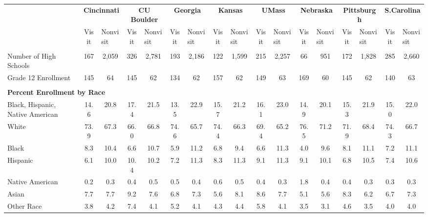 \begin{tabular*}{\linewidth}{@{\extracolsep{\fill} } lcccccccccccccccc}%
&\multicolumn{2}{c}{\bfseries Cincinnati}&\multicolumn{2}{c}{\bfseries CU Boulder}&\multicolumn{2}{c}{\bfseries Georgia}&\multicolumn{2}{c}{\bfseries Kansas}&\multicolumn{2}{c}{\bfseries UMass}&\multicolumn{2}{c}{\bfseries Nebraska}&\multicolumn{2}{c}{\bfseries Pittsburgh}&\multicolumn{2}{c}{\bfseries S.Carolina}\\%
&Visit&\multicolumn{1}{l}{Nonvisit}&Visit&\multicolumn{1}{l}{Nonvisit}&Visit&\multicolumn{1}{l}{Nonvisit}&Visit&\multicolumn{1}{l}{Nonvisit}&Visit&\multicolumn{1}{l}{Nonvisit}&Visit&\multicolumn{1}{l}{Nonvisit}&Visit&\multicolumn{1}{l}{Nonvisit}&Visit&\multicolumn{1}{l}{Nonvisit}\\%
\hline%
&&&&&&&&&&&&&&&&\\%
\hspace{0cm}Number of High Schools&167&2,059&326&2,781&193&2,186&122&1,599&215&2,257&66&951&172&1,828&285&2,660\\%
\hspace{0cm}Grade 12 Enrollment&145&64&145&62&134&62&157&62&149&63&169&60&145&62&140&63\\%
&&&&&&&&&&&&&&&&\\%
\multicolumn{17}{l}{\bfseries Percent Enrollment by Race}\\%
\hspace{0.2cm}Black, Hispanic, Native American&14.6&20.8&17.4&21.5&13.5&22.9&15.7&21.2&16.1&23.0&14.9&20.1&15.3&21.9&15.0&22.0\\%
\hspace{0.2cm}White&73.9&67.3&66.0&66.8&74.6&65.7&74.4&66.3&69.4&65.2&76.5&71.2&71.9&68.4&74.3&66.7\\%
\hspace{0.2cm}Black&8.3&10.4&6.6&10.7&5.9&11.2&6.8&9.4&6.6&11.3&4.0&9.6&8.1&11.1&7.2&11.1\\%
\hspace{0.2cm}Hispanic&6.1&10.0&10.4&10.2&7.2&11.3&8.3&11.3&9.1&11.3&9.1&10.1&6.8&10.5&7.4&10.6\\%
\hspace{0.2cm}Native American&0.2&0.3&0.4&0.5&0.5&0.4&0.6&0.5&0.4&0.3&1.8&0.4&0.4&0.3&0.3&0.3\\%
\hspace{0.2cm}Asian&7.7&7.7&9.2&7.6&6.8&7.3&5.6&8.1&8.6&7.7&5.1&5.6&8.3&6.2&6.7&7.3\\%
\hspace{0.2cm}Other Race&3.8&4.2&7.4&4.1&5.2&4.1&4.3&4.4&5.8&4.1&3.5&3.1&4.6&3.5&4.0&4.0\\%

\end{tabular*}
